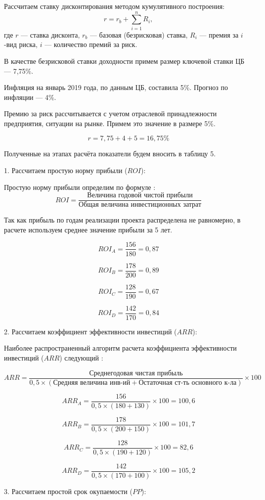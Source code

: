 Рассчитаем ставку дисконтирования методом кумулятивного построения:
\[ r = r_b + \sum\limits_{i=1}^{n} R_i, \]
где  $r$ --- ставка дисконта,
$r_b$ --- базовая (безрисковая) ставка,
$R_i$ --- премия за $i$-вид риска,
$i$ --- количество премий за риск.

В качестве безрисковой ставки доходности примем размер ключевой ставки ЦБ --- 7,75\%. 

Инфляция на январь 2019 года, по данным ЦБ, составила 5\%. Прогноз по инфляции --- 4\%.

Премию за риск рассчитывается с учетом отраслевой принадлежности предприятия, ситуации на рынке. Примем это значение в размере 5\%.

\[ r = 7,75  + 4 + 5 = 16,75 \%\]

Полученные на этапах расчёта показатели будем вносить в таблицу 5.

1. Рассчитаем простую норму прибыли ($ROI$):

Простую норму прибыли определим по формуле \cite[174]{sergeev}:
\[ ROI = \dfrac{\text{Величина годовой чистой прибыли}}{\text{Общая величина инвестиционных затрат}}\]

Так как прибыль по годам реализации проекта распределена не равномерно, в расчете используем среднее значение прибыли за 5 лет.

\[ ROI_A = \dfrac{156}{180} = 0,87\]

\[ ROI_B = \dfrac{178}{200}=0,89\]

\[ ROI_C = \dfrac{128}{190}=0,67\]

\[ ROI_D =  \dfrac{142}{170}=0,84\]

2. Рассчитаем коэффициент эффективности инвестиций ($ARR$):

Наиболее распространенный алгоритм расчета коэффициента эффективности инвестиций ($ARR$) следующий \cite[214]{leontev}:

\[ ARR = \dfrac{\text{Среднегодовая чистая прибыль}}{0,5 \times (\text{Средняя величина инв-ий} + \text{Остаточная ст-ть основного к-ла})} \times 100 \]

\[ ARR_A =  \dfrac{156}{0,5 \times (180 + 130)} \times 100 =100,6\]

\[ ARR_B =   \dfrac{178}{0,5 \times (200 + 150)} \times 100 =101,7\]

\[ ARR_C =  \dfrac{128}{0,5 \times (190 + 120)} \times 100 =82,6\]

\[ ARR_D =  \dfrac{142}{0,5 \times (170 + 100)} \times 100 =105,2\]

3. Рассчитаем простой срок окупаемости ($PP$):

